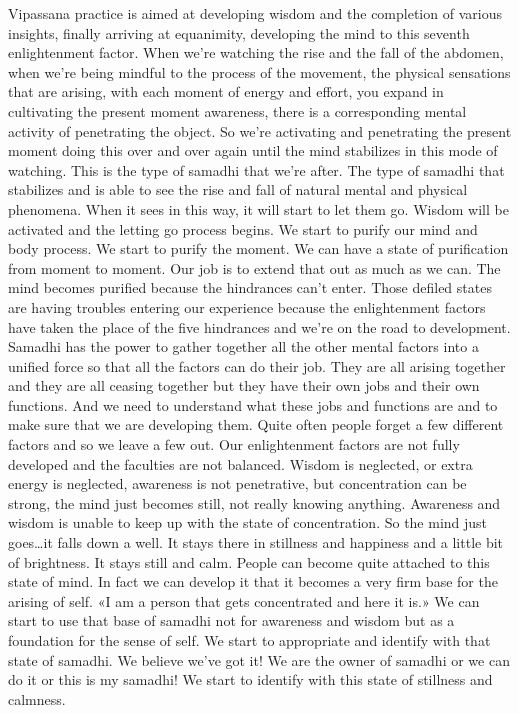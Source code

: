 \documentclass[letterpaper,10pt,english]{sphinxmanual}
\begin{document}
\sphinxAtStartPar
Vipassana practice is aimed at developing wisdom and the completion
of  various  insights,  finally  arriving  at  equanimity,  developing  the  mind  to
this seventh enlightenment factor. When we’re watching the rise and the fall
of the abdomen, when we’re being mindful to the process of the movement,
the  physical  sensations  that  are  arising,  with  each  moment  of  energy  and
effort, you expand in cultivating the present moment awareness, there is a
corresponding mental activity of penetrating the object. So we’re activating
  and penetrating the present moment doing this over and over again until the
mind stabilizes in this mode of watching. This is the type of samadhi that
we’re after. The type of samadhi that stabilizes and is able to see the rise and
fall of natural mental and physical phenomena. When it sees in this way, it
will start to let them go. Wisdom will be activated and the letting go process
begins. We start to purify our mind and body process. We start to purify the
moment. We can have a state of purification from moment to moment. Our
job  is  to  extend  that  out  as  much  as  we  can.  The  mind  becomes  purified
because the hindrances can’t enter. Those defiled states are having troubles
entering  our  experience  because  the  enlightenment  factors  have  taken  the
place of the five hindrances and we’re on the road to development. Samadhi
has the power to gather together all the other mental factors into a unified
force  so  that  all  the  factors  can  do  their  job. They  are  all  arising  together
and they are all ceasing together but they have their own jobs and their own
functions. And we need to understand what these jobs and functions are and
to make sure that we are developing them. Quite often people forget a few
different factors and so we leave a few out. Our enlightenment factors are
not fully developed and the faculties are not balanced. Wisdom is neglected,
or extra energy is neglected, awareness is not penetrative, but concentration
can  be  strong,  the  mind  just  becomes  still,  not  really  knowing  anything.
Awareness and wisdom is unable to keep up with the state of concentration.
So the mind just goes…it falls down a well. It stays there in stillness and
happiness  and  a  little  bit  of  brightness.  It  stays  still  and  calm.  People  can
become quite attached to this state of mind. In fact we can develop it that
it becomes a very firm base for the arising of self. «I am a person that gets
concentrated and here it is.» We can start to use that base of samadhi not for
awareness and wisdom but as a foundation for the sense of self. We start to
appropriate and identify with that state of samadhi. We believe we’ve got it!
We are the owner of samadhi or we can do it or this is my samadhi! We start
to identify with this state of stillness and calmness.
\end{document}
